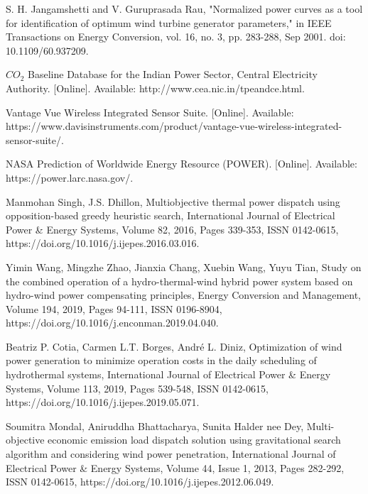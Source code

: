 \begin{thebibliography}{99}
\begin{singlespace}
 S. H. Jangamshetti and V. Guruprasada Rau, "Normalized power curves as a tool for identification of optimum wind turbine generator parameters," in IEEE Transactions on Energy Conversion, vol. 16, no. 3, pp. 283-288, Sep 2001. doi: 10.1109/60.937209.

 $CO_2$ Baseline Database for the Indian Power Sector, Central Electricity Authority. [Online]. Available: http://www.cea.nic.in/tpeandce.html.

 Vantage Vue Wireless Integrated Sensor Suite. [Online]. Available: https://www.davisinstruments.com/product/vantage-vue-wireless-integrated-sensor-suite/.


 NASA Prediction of Worldwide Energy Resource (POWER). [Online]. Available: https://power.larc.nasa.gov/.

Manmohan Singh, J.S. Dhillon, Multiobjective thermal power dispatch using opposition-based greedy heuristic search, International Journal of Electrical Power \& Energy Systems, Volume 82, 2016, Pages 339-353, ISSN 0142-0615, https://doi.org/10.1016/j.ijepes.2016.03.016.

 Yimin Wang, Mingzhe Zhao, Jianxia Chang, Xuebin Wang, Yuyu Tian, Study on the combined operation of a hydro-thermal-wind hybrid power system based on hydro-wind power compensating principles, Energy Conversion and Management, Volume 194, 2019, Pages 94-111, ISSN 0196-8904, \\ https://doi.org/10.1016/j.enconman.2019.04.040.

 Beatriz P. Cotia, Carmen L.T. Borges, André L. Diniz, Optimization of wind power generation to minimize operation costs in the daily scheduling of hydrothermal systems, International Journal of Electrical Power \& Energy Systems, Volume 113, 2019, Pages 539-548, ISSN 0142-0615, https://doi.org/10.1016/j.ijepes.2019.05.071.

 Soumitra Mondal, Aniruddha Bhattacharya, Sunita Halder nee Dey, Multi-objective economic emission load dispatch solution using gravitational search algorithm and considering wind power penetration, International Journal of Electrical Power \& Energy Systems, Volume 44, Issue 1, 2013, Pages 282-292, ISSN 0142-0615, https://doi.org/10.1016/j.ijepes.2012.06.049.


\end{singlespace}
\end{thebibliography}
